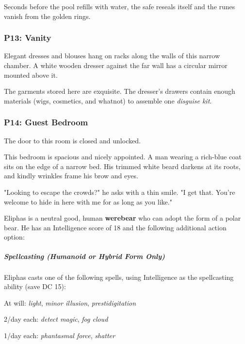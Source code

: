 \documentclass[10pt,a4paper,twoside,bg=print,twocolumn,openany,nodeprecatedcode]{dndbook}
\begin{document}
Seconds before the pool refills with water, the safe reseals itself and the runes vanish from the golden rings.

\subsubsection{P13: Vanity}
\begin{DndReadAloud}{}
Elegant dresses and blouses hang on racks along the walls of this narrow chamber. A white wooden dresser against the far wall has a circular mirror mounted above it.

\end{DndReadAloud}

The garments stored here are exquisite. The dresser's drawers contain enough materials (wigs, cosmetics, and whatnot) to assemble one \textit{disguise kit}.

\subsubsection{P14: Guest Bedroom}
The door to this room is closed and unlocked.

\begin{DndReadAloud}{}
This bedroom is spacious and nicely appointed. A man wearing a rich-blue coat sits on the edge of a narrow bed. His trimmed white beard darkens at its roots, and kindly wrinkles frame his brow and eyes.

"Looking to escape the crowds?" he asks with a thin smile. "I get that. You're welcome to hide in here with me for as long as you like."

\end{DndReadAloud}

Eliphas is a neutral good, human \textbf{werebear} who can adopt the form of a polar bear. He has an Intelligence score of 18 and the following additional action option:

\begin{DndReadAloud}{}
\subparagraph{Spellcasting (Humanoid or Hybrid Form Only)}
Eliphas casts one of the following spells, using Intelligence as the spellcasting ability (save DC 15):

At will: \textit{light}, \textit{minor illusion}, \textit{prestidigitation}

2/day each: \textit{detect magic}, \textit{fog cloud}

1/day each: \textit{phantasmal force}, \textit{shatter}

\end{DndReadAloud}
\end{document}
